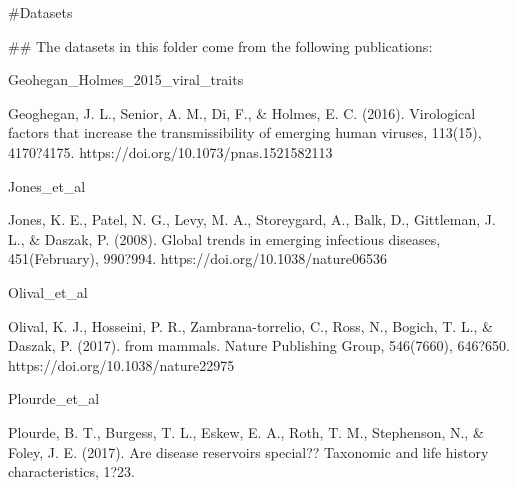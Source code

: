 #Datasets

## The datasets in this folder come from the following publications:

Geohegan_Holmes_2015_viral_traits 

Geoghegan, J. L., Senior, A. M., Di, F., & Holmes, E. C. (2016). Virological factors that increase the transmissibility of emerging human viruses, 113(15), 4170?4175. https://doi.org/10.1073/pnas.1521582113

Jones_et_al

Jones, K. E., Patel, N. G., Levy, M. A., Storeygard, A., Balk, D., Gittleman, J. L., & Daszak, P. (2008). Global trends in emerging infectious diseases, 451(February), 990?994. https://doi.org/10.1038/nature06536

Olival_et_al

Olival, K. J., Hosseini, P. R., Zambrana-torrelio, C., Ross, N., Bogich, T. L., & Daszak, P. (2017). from mammals. Nature Publishing Group, 546(7660), 646?650. https://doi.org/10.1038/nature22975

Plourde_et_al

Plourde, B. T., Burgess, T. L., Eskew, E. A., Roth, T. M., Stephenson, N., & Foley, J. E. (2017). Are disease reservoirs special?? Taxonomic and life history characteristics, 1?23.

